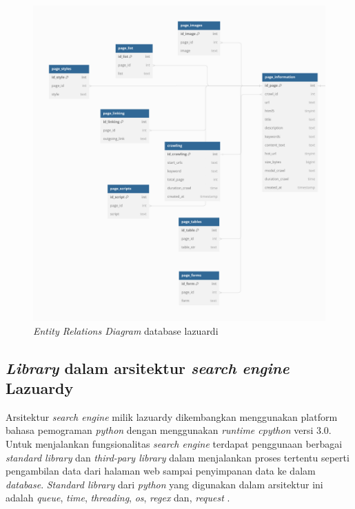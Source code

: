 \begin{figure}[H]
	\centering
	\includegraphics[keepaspectratio, width=14.5cm]{gambar/crawler-erd.png}
  \caption{\emph{Entity Relations Diagram} database lazuardi \citep{lazuardithesis}}
	\label{gambar:lazuardy_database}
\end{figure}

\subsection{\emph{Library} dalam arsitektur \emph{search engine} Lazuardy}

Arsitektur \emph{search engine} milik lazuardy dikembangkan menggunakan platform bahasa pemograman \emph{python} dengan menggunakan \emph{runtime cpython} versi 3.0. Untuk menjalankan fungsionalitas \emph{search engine} terdapat penggunaan berbagai \emph{standard library} dan \emph{third-pary library} dalam menjalankan proses tertentu seperti pengambilan data dari halaman web sampai penyimpanan data ke dalam \emph{database}. \emph{Standard library} dari \emph{python} yang digunakan dalam arsitektur ini adalah \emph{queue}, \emph{time}, \emph{threading}, \emph{os}, \emph{regex} dan, \emph{request} \citep{lazuardithesis}.

